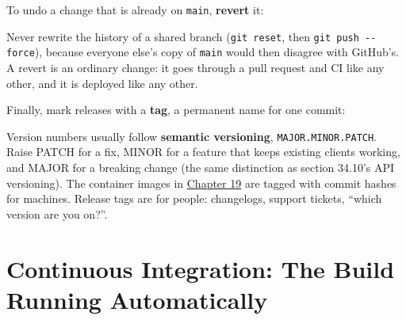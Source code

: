 To undo a change that is already on \texttt{main}, \textbf{revert} it:

\begin{codebox}[short]

\begin{Shaded}
\begin{Highlighting}[]
\OperatorTok{\textless{}}\OperatorTok{\textgreater{}}      
\end{Highlighting}
\end{Shaded}

\end{codebox}

\noindent{}Never rewrite the history of a shared branch (\texttt{git\ reset}, then \texttt{git\ push\ -\/-force}), because everyone else's copy of \texttt{main} would then disagree with GitHub's. A revert is an ordinary change: it goes through a pull request and CI like any other, and it is deployed like any other.

Finally, mark releases with a \textbf{tag}, a permanent name for one commit:

\begin{codebox}[short]

\begin{Shaded}
\begin{Highlighting}[]
 
\end{Highlighting}
\end{Shaded}

\end{codebox}

\noindent{}Version numbers usually follow \textbf{semantic versioning}, \texttt{MAJOR.MINOR.PATCH}. Raise PATCH for a fix, MINOR for a feature that keeps existing clients working, and MAJOR for a breaking change (the same distinction as section 34.10's API versioning). The container images in \hyperref[ch:19-artifact-storage]{Chapter 19} are tagged with commit hashes for machines. Release tags are for people: changelogs, support tickets, ``which version are you on?''.

\setcounter{section}{9}
\section{Continuous Integration: The Build Running Automatically}\label{17-build-process:1710-continuous-integration-the-build-running-automatically}

